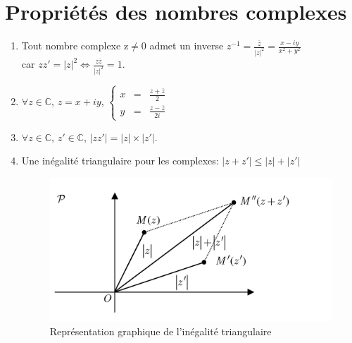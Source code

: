 \documentclass[a4paper,10pt]{book}
\newcommand{\C}{\mathbb{C}}
\begin{document}
\section{Propriétés des nombres complexes}
\begin{enumerate}
\item Tout nombre complexe z$ \neq 0$ admet un inverse  $z^{-1}=\frac{\overline{z}}{|z|^{2}}=\frac{x-iy}{x^{2}+y^{2}}$\\
car $zz'=|z|^{2} \Leftrightarrow \frac{z\overline{z}}{|z|^{2}}=1$.\\
\item $\forall z \in \C$, $z=x+iy$, $\left \{ \begin{array}{rcl} x&=&\frac{z+\overline{z}}{2} \\
y&=&\frac{z-\overline{z}}{2i} \end{array} \right . $\\
\item $\forall z \in \C$, $z' \in \C$, $|zz'|=|z| \times |z'|$.\\
\item Une inégalité triangulaire pour les complexes: $|z+z'|\leq |z|+|z'|$
\begin{figure}[h] \begin{center}
\includegraphics[scale=1.1]{images/200.png}
\caption{Représentation graphique de l'inégalité triangulaire}
\end{center} \end{figure}

\end{enumerate}
\end{document}
